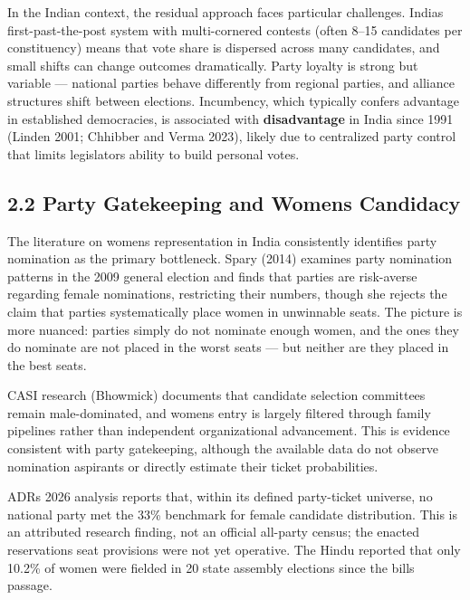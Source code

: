 \documentclass[
]{article}
\begin{document}
In the Indian context, the residual approach faces particular challenges. India\textquotesingle s first-past-the-post system with multi-cornered contests (often 8--15 candidates per constituency) means that vote share is dispersed across many candidates, and small shifts can change outcomes dramatically. Party loyalty is strong but variable --- national parties behave differently from regional parties, and alliance structures shift between elections. Incumbency, which typically confers advantage in established democracies, is associated with \textbf{disadvantage} in India since 1991 (Linden 2001; Chhibber and Verma 2023), likely due to centralized party control that limits legislators\textquotesingle{} ability to build personal votes.

\subsection{2.2 Party Gatekeeping and Women\textquotesingle s Candidacy}\label{22-party-gatekeeping-and-womens-candidacy}

The literature on women\textquotesingle s representation in India consistently identifies party nomination as the primary bottleneck. Spary (2014) examines party nomination patterns in the 2009 general election and finds that parties are risk-averse regarding female nominations, restricting their numbers, though she rejects the claim that parties systematically place women in unwinnable seats. The picture is more nuanced: parties simply do not nominate enough women, and the ones they do nominate are not placed in the worst seats --- but neither are they placed in the best seats.

CASI research (Bhowmick) documents that candidate selection committees remain male-dominated, and women\textquotesingle s entry is largely filtered through family pipelines rather than independent organizational advancement. This is evidence consistent with party gatekeeping, although the available data do not observe nomination aspirants or directly estimate their ticket probabilities.

ADR\textquotesingle s 2026 analysis reports that, within its defined party-ticket universe, no national party met the 33\% benchmark for female candidate distribution. This is an attributed research finding, not an official all-party census; the enacted reservation\textquotesingle s seat provisions were not yet operative. The Hindu reported that only 10.2\% of women were fielded in 20 state assembly elections since the bill\textquotesingle s passage.
\end{document}
